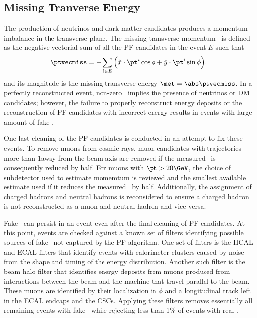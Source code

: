 \subsection{Missing Tranverse Energy}
\label{sec:pf_met}

The production of neutrinos and dark matter candidates produces a momentum imbalance in the transverse plane.
The missing transverse momentum \ptvecmiss\ is defined as the negative vectorial sum of all the PF candidates in the event $E$ such that
\begin{equation}
  \ptvecmiss = - \sum_{i\in E} \Big( \hat x \cdot \pt^i \cos \phi + \hat y \cdot \pt^i \sin \phi \Big),
\end{equation}
and its magnitude is the missing transverse energy $\met = \abs\ptvecmiss$.
In a perfectly reconstructed event, non-zero \met\ implies the presence of neutrinos or DM candidates; however, the failure to properly reconstruct energy deposits or the reconstruction of PF candidates with incorrect energy results in events with large amount of fake \met.

One last cleaning of the PF candidates is conducted in an attempt to fix these events.
To remove muons from cosmic rays, muon candidates with trajectories more than 1\cm away from the beam axis are removed if the measured \met\ is consequently reduced by half.
For muons with $\pt > 20\GeV$, the choice of subdetector used to estimate momemtum is reviewed and the smallest available estimate used if it reduces the measured \met\ by half.
Additionally, the assignment of charged hadrons and neutral hadrons is reconsidered to ensure a charged hadron is not reconstructed as a muon and neutral hadron and vice versa.

Fake \met\ can persist in an event even after the final cleaning of PF candidates.
At this point, events are checked against a known set of filters identifying possible sources of fake \met\ not captured by the PF algorithm.
One set of filters is the HCAL and ECAL filters that identify events with calorimeter clusters caused by noise from the shape and timing of the energy distribution.
Another such filter is the beam halo filter that identifies energy deposits from muons produced from interactions between the beam and the machine that travel parallel to the beam. These muons are identified by their localization in $\phi$ and a longitudinal track left in the ECAL endcaps and the CSCs.
Applying these filters removes essentially all remaining events with fake \met\ while rejecting less than 1\% of events with real \met.

